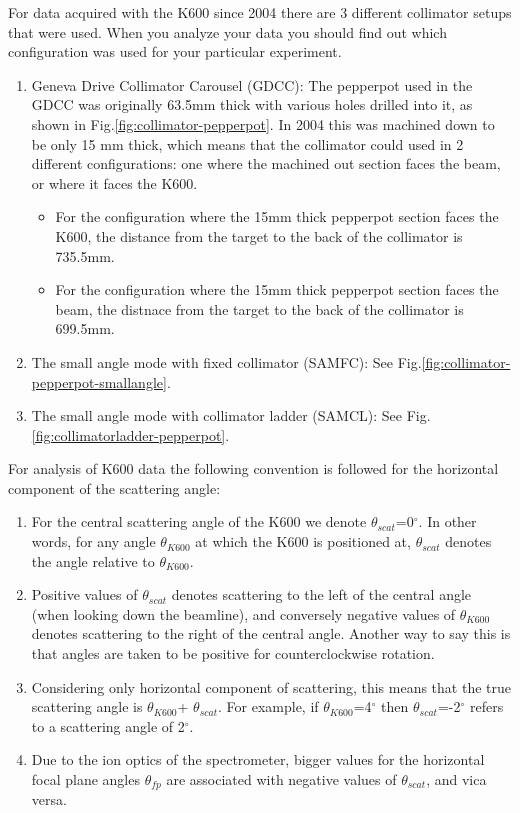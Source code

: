 \documentclass[11pt]{report}
\begin{document}
For data acquired with the K600 since 2004 there are 3 different collimator setups
that were used.  When you analyze your data you should find out which configuration
was used for your particular experiment.
\begin{enumerate}
\item Geneva Drive Collimator Carousel (GDCC):
The pepperpot used in the GDCC was originally 63.5mm thick with various holes drilled
into it, as shown in Fig.\ref{fig:collimator-pepperpot}.
In 2004 this was machined down to be only 15 mm thick, which means that the collimator
could used in 2 different configurations: one where the machined out section faces the beam,
or where it faces the K600.
	\begin{itemize}
	\item For the configuration where the 15mm thick pepperpot section faces the K600, the distance
	from the target to the back of the collimator is 735.5mm.
	\item For the configuration where the 15mm thick pepperpot section faces the beam, the distnace
	from the target to the back of the collimator is 699.5mm.
	\end{itemize}
\item The small angle mode with fixed collimator (SAMFC): See Fig.\ref{fig:collimator-pepperpot-smallangle}.
\item The small angle mode with collimator ladder (SAMCL): See Fig.\ref{fig:collimatorladder-pepperpot}.
\end{enumerate}

\noindent For analysis of K600 data the following convention is followed for the horizontal component of the scattering angle:
\begin{enumerate}
\item For the central scattering angle of the K600 we denote $\theta_{scat}$=0$^{\circ}$.
In other words, for any angle  $\theta_{K600}$ at which the K600 is positioned at,
 $\theta_{scat}$ denotes the angle relative to  $\theta_{K600}$.
\item  Positive values of $\theta_{scat}$ denotes scattering to the left of the central angle
	(when looking down the beamline), and conversely negative values of $\theta_{K600}$  denotes scattering to the right of the central angle.
Another way to say this is that angles are taken to be positive for counterclockwise rotation.
\item Considering only horizontal component of scattering, this means that the
	true scattering angle is   $\theta_{K600}$+ $\theta_{scat}$.
	For example, if $\theta_{K600}$=4$^{\circ}$   then $\theta_{scat}$=-2$^{\circ}$ refers to a scattering angle of 2$^{\circ}$.
\item Due to the ion optics of the spectrometer, bigger values for the horizontal focal plane angles $\theta_{fp}$ are associated with
	negative values of  $\theta_{scat}$, and vica versa.
\end{enumerate}
\end{document}
